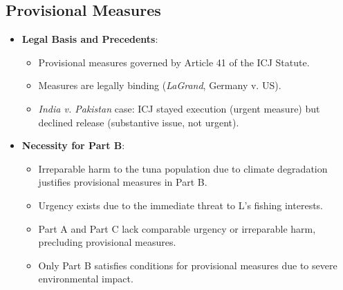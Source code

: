 \subsection{Provisional Measures}
\begin{itemize}
    \item \textbf{Legal Basis and Precedents}:
    \begin{itemize}
        \item Provisional measures governed by Article 41 of the ICJ Statute.
        \item Measures are legally binding (\textit{LaGrand}, Germany v. US).
        \item \textit{India v. Pakistan} case: ICJ stayed execution (urgent measure) but declined release (substantive issue, not urgent).
    \end{itemize}
    \item \textbf{Necessity for Part B}:
    \begin{itemize}
        \item Irreparable harm to the tuna population due to climate degradation justifies provisional measures in Part B.
        \item Urgency exists due to the immediate threat to L's fishing interests.
        \item Part A and Part C lack comparable urgency or irreparable harm, precluding provisional measures.
        \item Only Part B satisfies conditions for provisional measures due to severe environmental impact.
    \end{itemize}
\end{itemize}